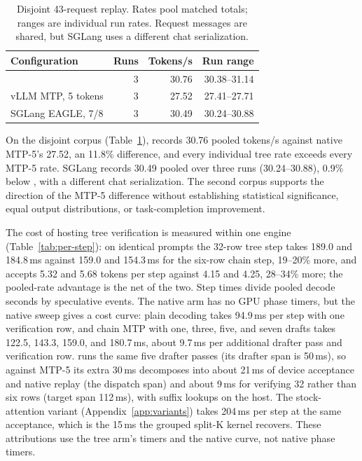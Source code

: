 \begin{table}[t]
\caption{Disjoint 43-request replay. Rates pool matched totals; ranges are individual run rates. Request messages are shared, but SGLang uses a different chat serialization.}
\label{tab:disjoint-replay}
\centering\small
\begin{tabular}{@{}lrrr@{}}
\toprule
Configuration & Runs & Tokens/s & Run range \\
\midrule
\sys{} & 3 & 30.76 & 30.38--31.14 \\
vLLM MTP, 5 tokens & 3 & 27.52 & 27.41--27.71 \\
SGLang EAGLE, 7/8 & 3 & 30.49 & 30.24--30.88 \\
\bottomrule
\end{tabular}
\end{table}

On the disjoint corpus (Table~\ref{tab:disjoint-replay}), \sys{} records 30.76 pooled tokens/s against native MTP-5's 27.52, an 11.8\% difference, and every individual tree rate exceeds every MTP-5 rate. SGLang records 30.49 pooled over three runs (30.24--30.88), 0.9\% below \sys{}, with a different chat serialization. The second corpus supports the direction of the MTP-5 difference without establishing statistical significance, equal output distributions, or task-completion improvement.

The cost of hosting tree verification is measured within one engine (Table~\ref{tab:per-step}): on identical prompts the 32-row tree step takes 189.0 and 184.8\,ms against 159.0 and 154.3\,ms for the six-row chain step, 19--20\% more, and accepts 5.32 and 5.68 tokens per step against 4.15 and 4.25, 28--34\% more; the pooled-rate advantage is the net of the two. Step times divide pooled decode seconds by speculative events. The native arm has no GPU phase timers, but the native sweep gives a cost curve: plain decoding takes 94.9\,ms per step with one verification row, and chain MTP with one, three, five, and seven drafts takes 122.5, 143.3, 159.0, and 180.7\,ms, about 9.7\,ms per additional drafter pass and verification row. \sys{} runs the same five drafter passes (its drafter span is 50\,ms), so against MTP-5 its extra 30\,ms decomposes into about 21\,ms of device acceptance and native replay (the dispatch span) and about 9\,ms for verifying 32 rather than six rows (target span 112\,ms), with suffix lookups on the host. The stock-attention variant (Appendix~\ref{app:variants}) takes 204\,ms per step at the same acceptance, which is the 15\,ms the grouped split-K kernel recovers. These attributions use the tree arm's timers and the native curve, not native phase timers.

